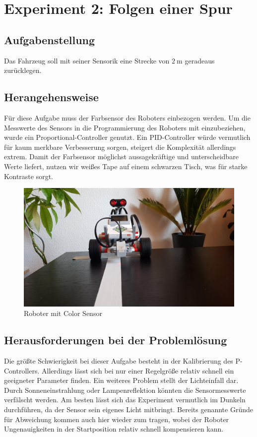 \documentclass[ngerman]{tudscrreprt}
\begin{document}
\section{Experiment 2: Folgen einer Spur}
\subsection{Aufgabenstellung}
Das Fahrzeug soll mit seiner Sensorik eine Strecke von $\SI{2}{\m}$ geradeaus
zurücklegen.

\subsection{Herangehensweise}
Für diese Aufgabe muss der Farbsensor des Roboters einbezogen werden. Um die Messwerte
des Sensors in die Programmierung des Roboters mit einzubeziehen, wurde ein
Proportional-Controller genutzt. Ein PID-Controller würde vermutlich für kaum merkbare
Verbesserung sorgen, steigert die Komplexität allerdings extrem. Damit der Farbsensor
möglichst aussagekräftige und unterscheidbare Werte liefert, nutzen wir weißes Tape auf
einem schwarzen Tisch, was für starke Kontraste sorgt.
%
\begin{figure}[H]
    \centering
    \includegraphics[scale=0.5]{src/images/robot_front.jpg}
    \caption{Roboter mit Color Sensor}
    \label{figure:roboter_mit_color_sensor}
\end{figure}
%
\subsection{Herausforderungen bei der Problemlösung}
Die größte Schwierigkeit bei dieser Aufgabe besteht in der Kalibrierung des P-Controllers.
Allerdings lässt sich bei nur einer Regelgröße relativ schnell ein geeigneter Parameter
finden. Ein weiteres Problem stellt der Lichteinfall dar. Durch Sonneneinstrahlung oder
Lampenreflektion könnten die Sensormesswerte verfälscht werden. Am besten lässt sich das
Experiment vermutlich im Dunkeln durchführen, da der Sensor sein eigenes Licht mitbringt.
Bereits genannte Gründe für Abweichung kommen auch hier wieder zum tragen, wobei der
Roboter Ungenauigkeiten in der Startposition relativ schnell kompensieren kann.
\end{document}

